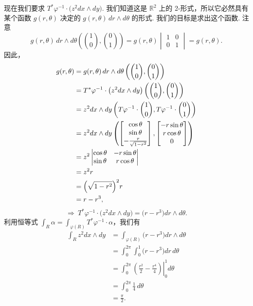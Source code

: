 现在我们要求 $T^*\varphi^{-1}\cdot\bigl(z^2dx\wedge dy\bigr)$. 我们知道这是 $\mathbb{R}^2$ 上的 2-形式，所以它必然具有某个函数 $g(r,\theta)$ 决定的 $g(r,\theta)\,dr\wedge d\theta$ 的形式. 我们的目标是求出这个函数. 注意
\[
g(r,\theta)\,dr\wedge d\theta\left(\binom{1}{0},\binom{0}{1}\right)=g(r,\theta)\begin{vmatrix}1&0\\0&1\end{vmatrix}=g(r,\theta).
\]
因此，
\begin{align*}
g(r,\theta)&=g(r,\theta)\,dr\wedge d\theta\left(\binom{1}{0},\binom{0}{1}\right)\\
&=T^*\varphi^{-1}\cdot\bigl(z^2dx\wedge dy\bigr)\left(\binom{1}{0},\binom{0}{1}\right)\\
&=z^2dx\wedge dy\left(T\varphi^{-1}\cdot\binom{1}{0},T\varphi^{-1}\cdot\binom{0}{1}\right)\\
&=z^2dx\wedge dy\left(\begin{bmatrix}\cos\theta\\\sin\theta\\-\frac{r}{\sqrt{1-r^2}}\end{bmatrix},\begin{bmatrix}-r\sin\theta\\r\cos\theta\\0\end{bmatrix}\right)\\
&=z^2\begin{vmatrix}\cos\theta&-r\sin\theta\\\sin\theta&r\cos\theta\end{vmatrix}\\
&=z^2r\\
&=\Bigl(\sqrt{1-r^2}\Bigr)^2r\\
&=r-r^3,
\end{align*}
\[
\Rightarrow\ T^*\varphi^{-1}\cdot\bigl(z^2dx\wedge dy\bigr)=\bigl(r-r^3\bigr)dr\wedge d\theta.
\]
利用恒等式 $\int_R\alpha=\int_{\varphi(R)}T^*\varphi^{-1}\cdot\alpha$，我们有
\begin{align*}
\int_R z^2dx\wedge dy
&=\int_{\varphi(R)}\bigl(r-r^3\bigr)dr\wedge d\theta\\
&=\int_0^{2\pi}\int_0^1\bigl(r-r^3\bigr)dr\,d\theta\\
&=\int_0^{2\pi}\left.\left(\frac{r^2}{2}-\frac{r^4}{4}\right)\right|_0^1d\theta\\
&=\int_0^{2\pi}\frac{1}{4}\,d\theta\\
&=\frac{\pi}{2}.
\end{align*}


